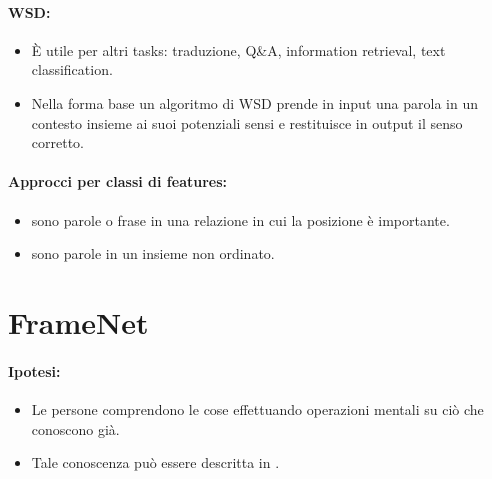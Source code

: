 \paragraph{WSD:}

\begin{itemize}
  \item È utile per altri tasks: traduzione, Q\&A, information retrieval, text classification. 
  \item Nella forma base un algoritmo di WSD prende in input una parola in un contesto insieme ai suoi potenziali sensi e restituisce in output il senso corretto.
\end{itemize}

\paragraph{Approcci per classi di features:}

\begin{itemize}
  \item {} sono parole o frase in una relazione in cui la posizione è importante.
  \item {} sono parole in un insieme non ordinato.
\end{itemize}




\section{FrameNet}

\paragraph{Ipotesi:}

\begin{itemize}
  \item Le persone comprendono le cose effettuando operazioni mentali su ciò che conoscono già. 
  \item Tale conoscenza può essere descritta in .
\end{itemize}

